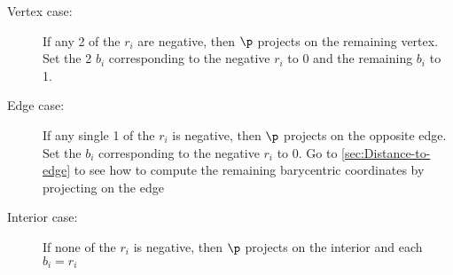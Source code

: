 \begin{description}

\item[Vertex case:]
If any 2 of the $r_i$ are negative,
then $\p$ projects on the remaining vertex.
Set the 2 $b_i$ corresponding to the negative $r_i$
to 0 and the remaining $b_i$ to 1.

\item[Edge case:]
If any single 1 of the $r_i$ is negative,
then $\p$ projects on the opposite edge.
Set the $b_i$ corresponding to the negative $r_i$
to 0.
Go to \autoref{sec:Distance-to-edge} to see
how to compute the remaining barycentric coordinates
by projecting on the edge

\item[Interior case:]
If none of the $r_i$ is negative,
then $\p$ projects on the interior
and each $b_i = r_i$

\end{description}
